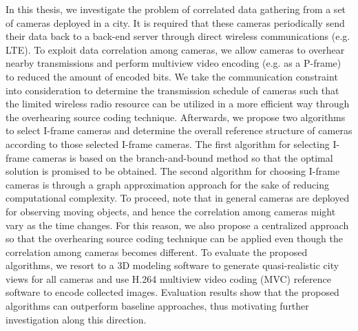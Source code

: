 In this thesis, we investigate the problem of correlated data gathering from a set of cameras deployed in a city.
It is required that these cameras periodically send their data back to a back-end server through direct wireless communications (e.g. LTE).
To exploit data correlation among cameras, we allow cameras to overhear nearby transmissions and perform multiview video encoding (e.g. as a P-frame) to reduced the amount of encoded bits.
We take the communication constraint into consideration to determine the transmission schedule of cameras such that the limited wireless radio resource can be utilized in a more efficient way through the overhearing source coding technique.
Afterwards, we propose two algorithms to select I-frame cameras and determine the overall reference structure of cameras according to those selected I-frame cameras.
The first algorithm for selecting I-frame cameras is based on the branch-and-bound method so that the optimal solution is promised to be obtained.
The second algorithm for choosing I-frame cameras is through a graph approximation approach for the sake of reducing computational complexity.
To proceed, note that in general cameras are deployed for observing moving objects, and hence the correlation among cameras might vary as the time changes.
For this reason, we also propose a centralized approach so that the overhearing source coding technique can be applied even though the correlation among cameras becomes different.
To evaluate the proposed algorithms, we resort to a 3D modeling software to generate quasi-realistic city views for all cameras and use H.264 multiview video coding (MVC) reference software to encode collected images.
Evaluation results show that the proposed algorithms can outperform baseline approaches, thus motivating further investigation along this direction.

